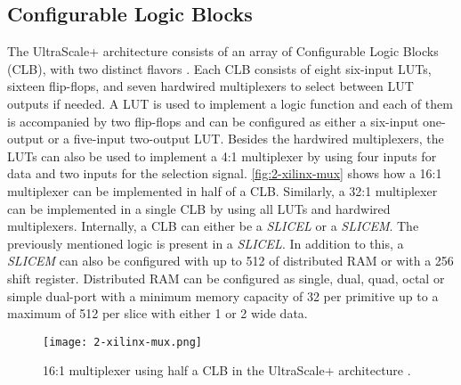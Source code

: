 \subsection{Configurable Logic Blocks}
\label{sec:clb}
The UltraScale+ architecture consists of an array of Configurable Logic Blocks (CLB), with two distinct flavors \cite{xilinx-ug574}. Each CLB consists of eight six-input LUTs, sixteen flip-flops, and seven hardwired multiplexers to select between LUT outputs if needed. A LUT is used to implement a logic function and each of them is accompanied by two flip-flops and can be configured as either a six-input one-output or a five-input two-output LUT. Besides the hardwired multiplexers, the LUTs can also be used to implement a 4:1 multiplexer by using four inputs for data and two inputs for the selection signal. \autoref{fig:2-xilinx-mux} shows how a 16:1 multiplexer can be implemented in half of a CLB. Similarly, a 32:1 multiplexer can be implemented in a single CLB by using all LUTs and hardwired multiplexers. Internally, a CLB can either be a \textit{SLICEL} or a \textit{SLICEM}. The previously mentioned logic is present in a \textit{SLICEL}. In addition to this, a \textit{SLICEM} can also be configured with up to \SI{512}{\bit} of distributed RAM or with a \SI{256}{\bit} shift register. Distributed RAM can be configured as single, dual, quad, octal or simple dual-port with a minimum memory capacity of \SI{32}{\bit} per primitive up to a maximum of \SI{512}{\bit} per slice with either \SI{1}{} or \SI{2}{\bit} wide data.

\begin{figure}[h]
  \centering
  \texttt{[image: 2-xilinx-mux.png]}
  \caption{16:1 multiplexer using half a CLB in the UltraScale+ architecture \cite{xilinx-ug574}.}
  \label{fig:2-xilinx-mux}
\end{figure}



